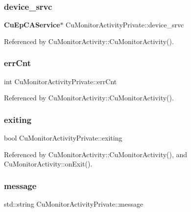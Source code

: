 \subsubsection{device\+\_\+srvc}
{\footnotesize\ttfamily \textbf{ Cu\+Ep\+C\+A\+Service}$\ast$ Cu\+Monitor\+Activity\+Private\+::device\+\_\+srvc}



Referenced by Cu\+Monitor\+Activity\+::\+Cu\+Monitor\+Activity().

\mbox{\label{classCuMonitorActivityPrivate_aee1880a845a07056c461f2d7da55884d}} 
\subsubsection{err\+Cnt}
{\footnotesize\ttfamily int Cu\+Monitor\+Activity\+Private\+::err\+Cnt}



Referenced by Cu\+Monitor\+Activity\+::\+Cu\+Monitor\+Activity().

\mbox{\label{classCuMonitorActivityPrivate_acf6a9a415cc4959e12b4fa1c8375e6b1}} 
\subsubsection{exiting}
{\footnotesize\ttfamily bool Cu\+Monitor\+Activity\+Private\+::exiting}



Referenced by Cu\+Monitor\+Activity\+::\+Cu\+Monitor\+Activity(), and Cu\+Monitor\+Activity\+::on\+Exit().

\mbox{\label{classCuMonitorActivityPrivate_a11da2a275e707ce31a4007dae78eb446}} 
\subsubsection{message}
{\footnotesize\ttfamily std\+::string Cu\+Monitor\+Activity\+Private\+::message}

\mbox{\label{classCuMonitorActivityPrivate_aea3c151af6edead42f59e5a26169c97b}} 
